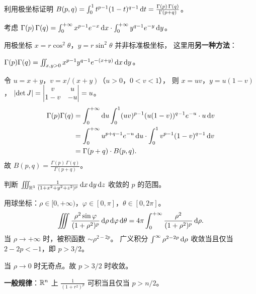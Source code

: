 \documentclass{ctexart}
\begin{document}
\begin{exercise}
  利用极坐标证明
  $B(p,q) = \int_0^1 t^{p-1}(1-t)^{q-1}\,\mathrm{d} t
  = \frac{\Gamma(p)\,\Gamma(q)}{\Gamma(p+q)}$。
\end{exercise}

\begin{solution}
  考虑 $\Gamma(p)\,\Gamma(q)
  = \int_0^{+\infty} x^{p-1}e^{-x}\,\mathrm{d} x \cdot \int_0^{+\infty} y^{q-1}e^{-y}\,\mathrm{d} y$。

  用极坐标 $x = r\cos^2\theta$，$y = r\sin^2\theta$ 并非标准极坐标，
  这里用\textbf{另一种方法}：

  $\Gamma(p)\Gamma(q) = \iint_{x,y>0} x^{p-1}y^{q-1}e^{-(x+y)}\,\mathrm{d} x\,\mathrm{d} y$。

  令 $u = x+y$，$v = x/(x+y)$（$u > 0$，$0 < v < 1$），
  则 $x = uv$，$y = u(1-v)$，
  $\left| \det J \right| = \begin{vmatrix} v & u \\ 1-v & -u \end{vmatrix} = u$。
  \begin{align*}
    \Gamma(p)\Gamma(q)
    &= \int_0^{+\infty} \mathrm{d} u \int_0^1 (uv)^{p-1}(u(1-v))^{q-1} e^{-u} \cdot u \,\mathrm{d} v \\
    &= \int_0^{+\infty} u^{p+q-1}e^{-u}\,\mathrm{d} u \cdot \int_0^1 v^{p-1}(1-v)^{q-1}\,\mathrm{d} v \\
    &= \Gamma(p+q) \cdot B(p,q).
  \end{align*}
  故 $B(p,q) = \frac{\Gamma(p)\,\Gamma(q)}{\Gamma(p+q)}$。
\end{solution}

\begin{exercise}[反常积分收敛性判定]
  判断 $\iiint_{\mathbb{R}^3} \frac{1}{(1+x^2+y^2+z^2)^p} \,\mathrm{d} x\,\mathrm{d} y\,\mathrm{d} z$
  收敛的 $p$ 的范围。
\end{exercise}

\begin{solution}
  用球坐标：$\rho \in [0,+\infty)$，$\varphi \in [0,\pi]$，$\theta \in [0,2\pi]$。
  \[
    \iiint \frac{\rho^2\sin\varphi}{(1+\rho^2)^p}\,\mathrm{d}\rho\,\mathrm{d}\varphi\,\mathrm{d}\theta
    = 4\pi \int_0^{+\infty} \frac{\rho^2}{(1+\rho^2)^p}\,\mathrm{d}\rho.
  \]
  当 $\rho \to +\infty$ 时，被积函数 $\sim \rho^{2-2p}$。
  广义积分 $\int^\infty \rho^{2-2p}\,\mathrm{d}\rho$ 收敛当且仅当 $2-2p < -1$，即 $p > 3/2$。

  当 $\rho \to 0$ 时无奇点。故 $p > 3/2$ 时收敛。

  \textbf{一般规律}：$\mathbb{R}^n$ 上 $\frac{1}{(1+r^2)^p}$ 可积当且仅当 $p > n/2$。
\end{solution}
\end{document}

